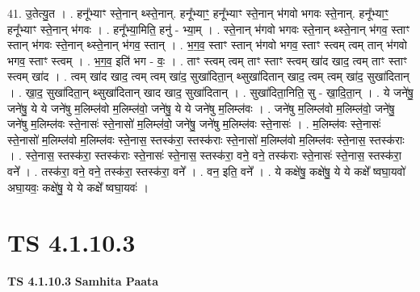 \documentclass[17pt]{extarticle}
\begin{document}
41. उ॒तेत्यु॒त । . हनू᳚भ्याꣳ स्ते॒नान् थ्स्ते॒नान्. हनू᳚भ्याꣳ॒॒ हनू᳚भ्याꣳ स्ते॒नान् भ॑गवो भगवः स्ते॒नान्. हनू᳚भ्याꣳ॒॒ हनू᳚भ्याꣳ स्ते॒नान् भ॑गवः । . हनू᳚भ्या॒मिति॒ हनु॑ - भ्या॒म् । . स्ते॒नान् भ॑गवो भगवः स्ते॒नान् थ्स्ते॒नान् भ॑गव॒ स्ताꣳ स्तान् भ॑गवः स्ते॒नान् थ्स्ते॒नान् भ॑गव॒ स्तान् । . भ॒ग॒व॒ स्ताꣳ स्तान् भ॑गवो भगव॒ स्ताꣳ स्त्वम् त्वम् तान् भ॑गवो भगव॒ स्ताꣳ स्त्वम् । . भ॒ग॒व॒ इति॑ भग - वः॒ । . ताꣳ स्त्वम् त्वम् ताꣳ स्ताꣳ स्त्वम् खा॑द खाद॒ त्वम् ताꣳ स्ताꣳ स्त्वम् खा॑द । . त्वम् खा॑द खाद॒ त्वम् त्वम् खा॑द॒ सुखा॑दिता॒न् थ्सुखा॑दितान् खाद॒ त्वम् त्वम् खा॑द॒ सुखा॑दितान् । . खा॒द॒ सुखा॑दिता॒न् थ्सुखा॑दितान् खाद खाद॒ सुखा॑दितान् । . सुखा॑दिता॒निति॒ सु - खा॒दि॒ता॒न् । . ये जने॑षु॒ जने॑षु॒ ये ये जने॑षु म॒लिम्ल॑वो म॒लिम्ल॑वो॒ जने॑षु॒ ये ये जने॑षु म॒लिम्ल॑वः । . जने॑षु म॒लिम्ल॑वो म॒लिम्ल॑वो॒ जने॑षु॒ जने॑षु म॒लिम्ल॑वः स्ते॒नासः॑ स्ते॒नासो॑ म॒लिम्ल॑वो॒ जने॑षु॒ जने॑षु म॒लिम्ल॑वः स्ते॒नासः॑ । . म॒लिम्ल॑वः स्ते॒नासः॑ स्ते॒नासो॑ म॒लिम्ल॑वो म॒लिम्ल॑वः स्ते॒नास॒ स्तस्क॑रा॒ स्तस्क॑राः स्ते॒नासो॑ म॒लिम्ल॑वो म॒लिम्ल॑वः स्ते॒नास॒ स्तस्क॑राः । . स्ते॒नास॒ स्तस्क॑रा॒ स्तस्क॑राः स्ते॒नासः॑ स्ते॒नास॒ स्तस्क॑रा॒ वने॒ वने॒ तस्क॑राः स्ते॒नासः॑ स्ते॒नास॒ स्तस्क॑रा॒ वने᳚ । . तस्क॑रा॒ वने॒ वने॒ तस्क॑रा॒ स्तस्क॑रा॒ वने᳚ । . वन॒ इति॒ वने᳚ । . ये कक्षे॑षु॒ कक्षे॑षु॒ ये ये कक्षे᳚ ष्वघा॒यवो॑ अघा॒यवः॒ कक्षे॑षु॒ ये ये कक्षे᳚ ष्वघा॒यवः॑ । \newline
\pagebreak
{}

\section{ TS 4.1.10.3 }

\textbf{TS 4.1.10.3 } \newline
\textbf{Samhita Paata} \newline
\end{document}
